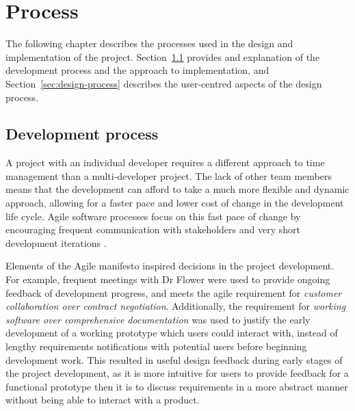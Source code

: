 \chapter{Process}\label{chap:process}

The following chapter describes the processes used in the design and
implementation of the project. Section~\ref{sec:development-process}
provides and explanation of the development process and the approach
to implementation, and Section~\ref{sec:design-process} describes the
user-centred aspects of the design process.

\section{Development process}\label{sec:development-process}

A project with an individual developer requires a different approach
to time management than a multi-developer project. The lack of other
team members means that the development can afford to take a much more
flexible and dynamic approach, allowing for a faster pace and lower
cost of change in the development life cycle. Agile software processes
focus on this fast pace of change by encouraging frequent
communication with stakeholders and very short development iterations
\cite{highsmith2001agile, martin2003agile}.

Elements of the Agile manifesto \cite{fowler2001agile} inspired
decisions in the project development. For example, frequent meetings
with Dr Flower were used to provide ongoing feedback of development
progress, and meets the agile requirement for \textit{customer
  collaboration over contract negotiation}. Additionally, the
requirement for \textit{working software over comprehensive
  documentation} was used to justify the early development of a
working prototype which users could interact with, instead of lengthy
requirements notifications with potential users before beginning
development work. This resulted in useful design feedback during early
stages of the project development, as it is more intuitive for users
to provide feedback for a functional prototype then it is to discuss
requirements in a more abstract manner without being able to interact
with a product.

